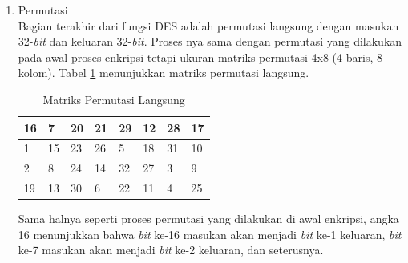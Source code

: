 \begin{enumerate}
Pada bagian ini, akan dilakukan operasi substitusi berdasarkan aturan pada \textit{S-box}. Setiap \textit{S-box} adalah matriks berukuran 4x16 (4 baris, 16 kolom). Setiap isi dari \textit{S-box} akan berbeda-beda. Kombinasi biner dari \textit{bit} ke-1 dan ke-6 masukan menunjukkan posisi baris yang akan dipilih dan kombinasi biner dari \textit{bit} masukan sisanya menunjukkan posisi kolom yang akan dipilih. Setelah itu, angka yang ditunjuk oleh baris dan kolom kombinasi biner ini akan diubah juga menjadi biner.

	Sebagai contoh, misalkan masukan untuk \textit{S-box} pertama adalah 110011. Maka, baris yang dipilih adalah 11 dalam biner dan 3 dalam desimal dan kolom yang dipilih adalah 1001 dalam biner dan 9 dalam desimal. Berarti, nilai yang didapat berdasarkan \textit{S-box} diatas adalah 11 dan dalam biner adalah 1011. Maka, keluaran dari 110011 adalah 1011.

	\item Permutasi\\
Bagian terakhir dari fungsi DES adalah permutasi langsung dengan masukan 32-\textit{bit} dan keluaran 32-\textit{bit}. Proses nya sama dengan permutasi yang dilakukan pada awal proses enkripsi tetapi ukuran matriks permutasi 4x8 (4 baris, 8 kolom). Tabel \ref{table:permutasi_langsung} menunjukkan matriks permutasi langsung.

\begin{table}[H]
	\begin{center}
		\begin{tabular}{|l|l|l|l|l|l|l|l|}
				\hline
			16	&	7	&	20	&	21	&	29	&	12	&	28	&	17	\\ \hline
			1	&	15	&	23	&	26	&	5	&	18	&	31	&	10		\\ \hline
			2	&	8	&	24	&	14	&	32	&	27	&	3	&	9				\\ \hline
			19	&	13	&	30	&	6	&	22	&	11	&	4	&	25	\\ \hline
		\end{tabular}
	\end{center}
	\caption{Matriks Permutasi Langsung}\label{table:permutasi_langsung}
\end{table}


Sama halnya seperti proses permutasi yang dilakukan di awal enkripsi, angka 16 menunjukkan bahwa \textit{bit} ke-16 masukan akan menjadi \textit{bit} ke-1 keluaran, \textit{bit} ke-7 masukan akan menjadi \textit{bit} ke-2 keluaran, dan seterusnya.
\end{enumerate}

